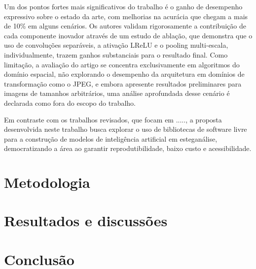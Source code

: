 \documentclass[12pt]{article}
\begin{document}
Um dos pontos fortes mais significativos do trabalho é o ganho de desempenho
expressivo sobre o estado da arte, com melhorias na acurácia que chegam a mais
de 10\% em alguns cenários. Os autores validam rigorosamente a contribuição de
cada componente inovador através de um estudo de ablação, que demonstra que o
uso de convoluções separáveis, a ativação LReLU e o pooling multi-escala,
individualmente, trazem ganhos substanciais para o resultado final. Como
limitação, a avaliação do artigo se concentra exclusivamente em algoritmos do
domínio espacial, não explorando o desempenho da arquitetura em domínios de
transformação como o JPEG, e embora apresente resultados preliminares para
imagens de tamanhos arbitrários, uma análise aprofundada desse cenário é
declarada como fora do escopo do trabalho.

Em contraste com os trabalhos revisados, que focam em ....., a proposta
desenvolvida neste trabalho busca explorar o uso de bibliotecas de software
livre para a construção de modelos de inteligência artificial em esteganálise,
democratizando a área ao garantir reprodutibilidade, baixo custo e
acessibilidade.

\section{Metodologia}

\section{Resultados e discussões}

\section{Conclusão}\label{sec:figs}






\end{document}
